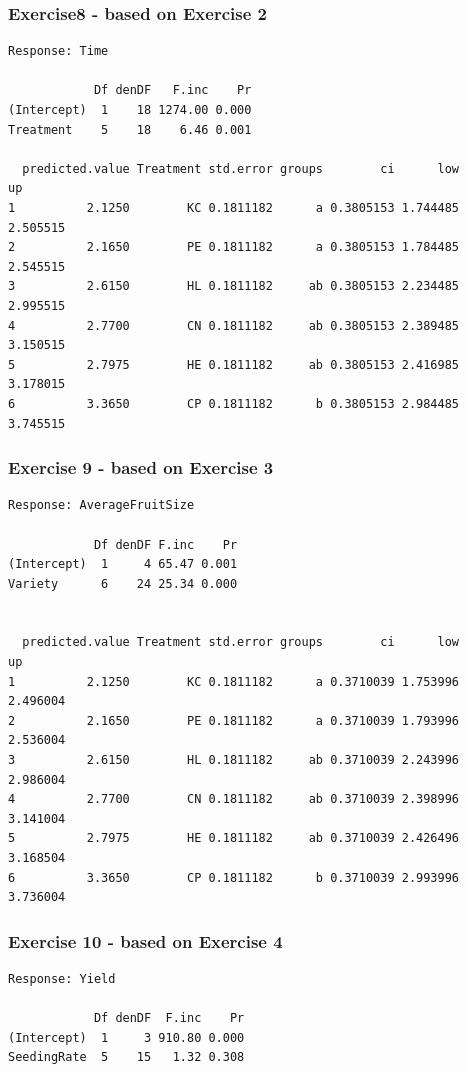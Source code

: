 \begin{frame}[fragile]\frametitle{Exercise8 - based on Exercise 2}
\begin{verbatim}
Response: Time

            Df denDF   F.inc    Pr
(Intercept)  1    18 1274.00 0.000
Treatment    5    18    6.46 0.001

  predicted.value Treatment std.error groups        ci      low       up
1          2.1250        KC 0.1811182      a 0.3805153 1.744485 2.505515
2          2.1650        PE 0.1811182      a 0.3805153 1.784485 2.545515
3          2.6150        HL 0.1811182     ab 0.3805153 2.234485 2.995515
4          2.7700        CN 0.1811182     ab 0.3805153 2.389485 3.150515
5          2.7975        HE 0.1811182     ab 0.3805153 2.416985 3.178015
6          3.3650        CP 0.1811182      b 0.3805153 2.984485 3.745515

\end{verbatim}
\end{frame}

\begin{frame}[fragile]\frametitle{Exercise 9 - based on Exercise 3}
\begin{verbatim}
Response: AverageFruitSize

            Df denDF F.inc    Pr
(Intercept)  1     4 65.47 0.001
Variety      6    24 25.34 0.000


  predicted.value Treatment std.error groups        ci      low       up
1          2.1250        KC 0.1811182      a 0.3710039 1.753996 2.496004
2          2.1650        PE 0.1811182      a 0.3710039 1.793996 2.536004
3          2.6150        HL 0.1811182     ab 0.3710039 2.243996 2.986004
4          2.7700        CN 0.1811182     ab 0.3710039 2.398996 3.141004
5          2.7975        HE 0.1811182     ab 0.3710039 2.426496 3.168504
6          3.3650        CP 0.1811182      b 0.3710039 2.993996 3.736004

\end{verbatim}
\end{frame}

\begin{frame}[fragile]\frametitle{Exercise 10 - based on Exercise 4}
\begin{verbatim}
Response: Yield

            Df denDF  F.inc    Pr
(Intercept)  1     3 910.80 0.000
SeedingRate  5    15   1.32 0.308

\end{verbatim}
\end{frame}

